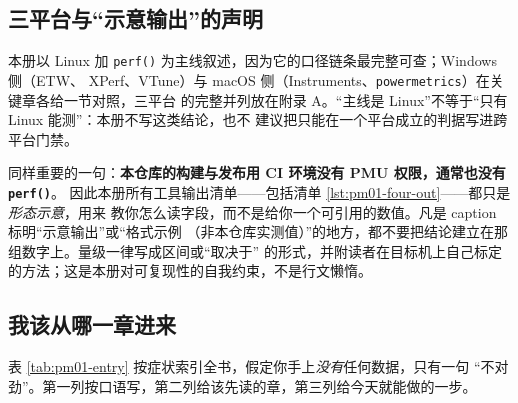 \documentclass[12pt,a4paper,fontset=fandol]{ctexbook}
\newcommand{\Fn}[1]{\texttt{#1()}}
\newcommand{\Tp}[1]{\texttt{#1}}
\begin{document}
\subsection{三平台与``示意输出''的声明}
\label{sub:pm01-platforms}

本册以 Linux 加 \Fn{perf} 为主线叙述，因为它的口径链条最完整可查；Windows 侧（ETW、
XPerf、VTune）与 macOS 侧（Instruments、\Tp{powermetrics}）在关键章各给一节对照，三平台
的完整并列放在附录 A。``主线是 Linux''不等于``只有 Linux 能测''：本册不写这类结论，也不
建议把只能在一个平台成立的判据写进跨平台门禁。

同样重要的一句：\textbf{本仓库的构建与发布用 CI 环境没有 PMU 权限，通常也没有 \Fn{perf}}。
因此本册所有工具输出清单——包括清单 \ref{lst:pm01-four-out}——都只是\emph{形态示意}，用来
教你怎么读字段，而不是给你一个可引用的数值。凡是 caption 标明``示意输出''或``格式示例
（非本仓库实测值）''的地方，都不要把结论建立在那组数字上。量级一律写成区间或``取决于''
的形式，并附读者在目标机上自己标定的方法；这是本册对可复现性的自我约束，不是行文懒惰。

\subsection{我该从哪一章进来}
\label{sub:pm01-entry}

表 \ref{tab:pm01-entry} 按症状索引全书，假定你手上\emph{没有}任何数据，只有一句
``不对劲''。第一列按口语写，第二列给该先读的章，第三列给今天就能做的一步。
\end{document}
